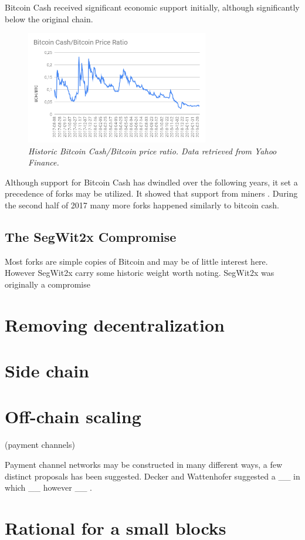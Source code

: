 Bitcoin Cash received significant economic support initially, although significantly below the original chain.

\begin{figure}[!htb]
	\hspace*{-0.7cm} 
	\centering
	\includegraphics[width=8cm]{images/Bitcoin_Cash_Bitcoin_Price_Ratio.png}
	\caption{\textit{Historic Bitcoin Cash/Bitcoin price ratio. Data retrieved from Yahoo Finance.}}
	\label{fig:bch_btc}
	\hspace*{2mm} 	
\end{figure}

Although support for Bitcoin Cash has dwindled over the following years, it set a precedence of forks may be utilized. It showed that support from miners . During the second half of 2017 many more forks happened similarly to bitcoin cash.

\subsection{The SegWit2x Compromise}

Most forks are simple copies of Bitcoin and may be of little interest here. However SegWit2x carry some historic weight worth noting. 
SegWit2x was originally a compromise 


\section{Removing decentralization}

\section{Side chain}

\section{Off-chain scaling}

(payment channels)

Payment channel networks may be constructed in many different ways, a few distinct proposals has been suggested. Decker and Wattenhofer suggested a \_\_ in which \_\_ however \_\_ \cite{decker:wattenhofer:duplex}.  

\section{Rational for a small blocks}

